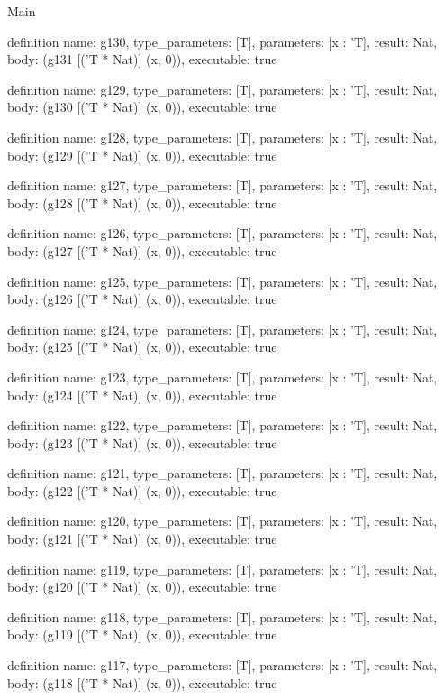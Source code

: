 \begin{lexlean}{Main}
\begin{semanticmodule}
definition{
  name: g130,
  type_parameters: [T],
  parameters: [x : 'T],
  result: Nat,
  body: (g131 [('T * Nat)] (x, 0)),
  executable: true
}

definition{
  name: g129,
  type_parameters: [T],
  parameters: [x : 'T],
  result: Nat,
  body: (g130 [('T * Nat)] (x, 0)),
  executable: true
}

definition{
  name: g128,
  type_parameters: [T],
  parameters: [x : 'T],
  result: Nat,
  body: (g129 [('T * Nat)] (x, 0)),
  executable: true
}

definition{
  name: g127,
  type_parameters: [T],
  parameters: [x : 'T],
  result: Nat,
  body: (g128 [('T * Nat)] (x, 0)),
  executable: true
}

definition{
  name: g126,
  type_parameters: [T],
  parameters: [x : 'T],
  result: Nat,
  body: (g127 [('T * Nat)] (x, 0)),
  executable: true
}

definition{
  name: g125,
  type_parameters: [T],
  parameters: [x : 'T],
  result: Nat,
  body: (g126 [('T * Nat)] (x, 0)),
  executable: true
}

definition{
  name: g124,
  type_parameters: [T],
  parameters: [x : 'T],
  result: Nat,
  body: (g125 [('T * Nat)] (x, 0)),
  executable: true
}

definition{
  name: g123,
  type_parameters: [T],
  parameters: [x : 'T],
  result: Nat,
  body: (g124 [('T * Nat)] (x, 0)),
  executable: true
}

definition{
  name: g122,
  type_parameters: [T],
  parameters: [x : 'T],
  result: Nat,
  body: (g123 [('T * Nat)] (x, 0)),
  executable: true
}

definition{
  name: g121,
  type_parameters: [T],
  parameters: [x : 'T],
  result: Nat,
  body: (g122 [('T * Nat)] (x, 0)),
  executable: true
}

definition{
  name: g120,
  type_parameters: [T],
  parameters: [x : 'T],
  result: Nat,
  body: (g121 [('T * Nat)] (x, 0)),
  executable: true
}

definition{
  name: g119,
  type_parameters: [T],
  parameters: [x : 'T],
  result: Nat,
  body: (g120 [('T * Nat)] (x, 0)),
  executable: true
}

definition{
  name: g118,
  type_parameters: [T],
  parameters: [x : 'T],
  result: Nat,
  body: (g119 [('T * Nat)] (x, 0)),
  executable: true
}

definition{
  name: g117,
  type_parameters: [T],
  parameters: [x : 'T],
  result: Nat,
  body: (g118 [('T * Nat)] (x, 0)),
  executable: true
}


\end{semanticmodule}
\end{lexlean}
